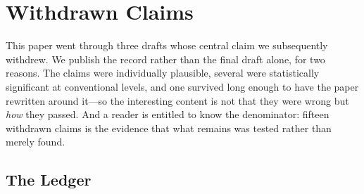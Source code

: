 \section{Withdrawn Claims}
\label{sec:ledger}

This paper went through three drafts whose central claim we subsequently
withdrew. We publish the record rather than the final draft alone, for two
reasons. The claims were individually plausible, several were statistically
significant at conventional levels, and one survived long enough to have the
paper rewritten around it---so the interesting content is not that they were
wrong but \emph{how} they passed. And a reader is entitled to know the
denominator: fifteen withdrawn claims is the evidence that what remains was
tested rather than merely found.

\subsection{The Ledger}

